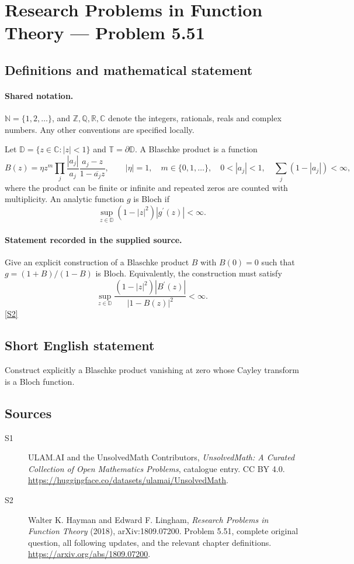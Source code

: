 \documentclass[11pt]{book}
\newcommand{\sref}[2]{\hyperlink{source:#1:#2}{[S#2]}}
\begin{document}
\section{Research Problems in Function Theory — Problem 5.51}\label{statement}

\subsection{Definitions and mathematical statement}

\paragraph{Shared notation.}$\mathbb N=\{1,2,\ldots\}$, and $\mathbb Z,\mathbb Q,\mathbb R,\mathbb C$ denote the integers, rationals, reals and complex numbers. Any other conventions are specified locally.


Let $\mathbb D=\{z\in\mathbb C:|z|<1\}$ and $\mathbb T=\partial\mathbb D$. A Blaschke product is a function \[B(z)=\eta z^m\prod_j\frac{|a_j|}{a_j}\frac{a_j-z}{1-\overline{a_j}z},\qquad |\eta|=1,\quad m\in\{0,1,\ldots\},\quad 0<|a_j|<1,\quad\sum_j(1-|a_j|)<\infty,\] where the product can be finite or infinite and repeated zeros are counted with multiplicity. An analytic function $g$ is Bloch if \[\sup_{z\in\mathbb D}(1-|z|^2)|g^{\prime}(z)|<\infty.\]
\paragraph{Statement recorded in the supplied source.}
Give an explicit construction of a Blaschke product $B$ with $B(0)=0$ such that $g=(1+B)/(1-B)$ is Bloch. Equivalently, the construction must satisfy \[\sup_{z\in\mathbb D}\frac{(1-|z|^2)|B^{\prime}(z)|}{|1-B(z)|^2}<\infty.\] \sref{statement}{2}
\subsection{Short English statement}
Construct explicitly a Blaschke product vanishing at zero whose Cayley transform is a Bloch function.
\subsection{Sources}
\begin{description}
\item[\hypertarget{source:statement:1}{S1}] ULAM.AI and the UnsolvedMath Contributors, \emph{UnsolvedMath: A Curated Collection of Open Mathematics Problems}, catalogue entry. CC BY 4.0. \url{https://huggingface.co/datasets/ulamai/UnsolvedMath}.
\item[\hypertarget{source:statement:2}{S2}] Walter K. Hayman and Edward F. Lingham, \emph{Research Problems in Function Theory} (2018), arXiv:1809.07200. Problem 5.51, complete original question, all following updates, and the relevant chapter definitions. \url{https://arxiv.org/abs/1809.07200}.
\end{description}
\label{end:statement}
\end{document}
